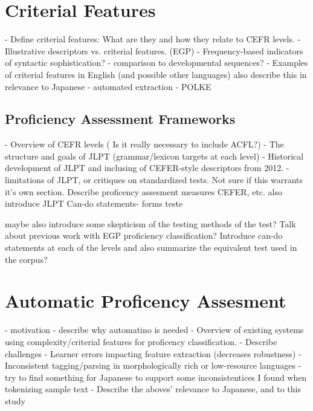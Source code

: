 \section{Criterial Features}
- Define criterial features: What are they and how they relate to CEFR levels.
- Illustrative descriptors vs. criterial features. (EGP)
- Frequency-based indicators of syntactic sophistication? \cite{Ellis2004}
    - comparison to developmental sequences?
- Examples of criterial features in English (and possible other languages) also describe this in relevance to Japanese
- automated extraction - POLKE


\subsection{Proficiency Assessment Frameworks}
- Overview of CEFR levels ( Is it really necessary to include ACFL?)
- The structure and goals of JLPT (grammar/lexicon targets at each level)
- Historical development of JLPT and inclusing of CEFER-style descriptors from 2012.
- limitations of JLPT, or critiques on standardized tests.
Not sure if this warrants it's own section. Describe proficency assesment measures CEFER, etc. also introduce JLPT
Can-do statements- forms teste


maybe also introduce some skepticism of the testing methods of the test?
Talk about previous work with EGP proficiency classification?
Introduce can-do statements at each of the levels and also summarize the equivalent test used in the corpus?


\section{Automatic Proficency Assesment}
- motivation - describe why automatino is needed
- Overview of existing systems using complexity/criterial features for proficency classification.
- Describe challenges
    - Learner errors impacting feature extraction (decreases robustness)
    -Inconsistent tagging/parsing in morphologically rich or low-resource languages
        -try to find something for Japanese to support some inconsistentices I found when tokenizing sample text
- Describe the aboves' relevance to Japanese, and to this study


